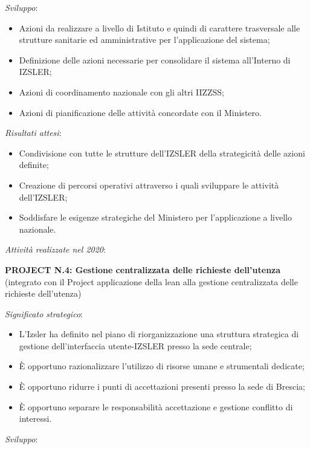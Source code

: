 \documentclass[
  12pt,
]{article}
\providecommand{\tightlist}{%
  \setlength{\itemsep}{0pt}\setlength{\parskip}{0pt}}
\begin{document}
\emph{Sviluppo}:

\begin{itemize}
\tightlist
\item
  Azioni da realizzare a livello di Istituto e quindi di carattere
  trasversale alle strutture sanitarie ed amministrative per
  l'applicazione del sistema;
\item
  Definizione delle azioni necessarie per consolidare il sistema
  all'Interno di IZSLER;
\item
  Azioni di coordinamento nazionale con gli altri IIZZSS;
\item
  Azioni di pianificazione delle attività concordate con il Ministero.
\end{itemize}

\emph{Risultati attesi}:

\begin{itemize}
\tightlist
\item
  Condivisione con tutte le strutture dell'IZSLER della strategicità
  delle azioni definite;
\item
  Creazione di percorsi operativi attraverso i quali sviluppare le
  attività dell'IZSLER;
\item
  Soddisfare le esigenze strategiche del Ministero per l'applicazione a
  livello nazionale.
\end{itemize}

\emph{Attività realizzate nel 2020}:

\textbf{PROJECT N.4: Gestione centralizzata delle richieste dell'utenza}
(integrato con il Project applicazione della lean alla gestione
centralizzata delle richieste dell'utenza)

\emph{Significato strategico}:

\begin{itemize}
\tightlist
\item
  L'Izsler ha definito nel piano di riorganizzazione una struttura
  strategica di gestione dell'interfaccia utente-IZSLER presso la sede
  centrale;
\item
  È opportuno razionalizzare l'utilizzo di risorse umane e strumentali
  dedicate;
\item
  È opportuno ridurre i punti di accettazioni presenti presso la sede di
  Brescia;
\item
  È opportuno separare le responsabilità accettazione e gestione
  conflitto di interessi.
\end{itemize}

\emph{Sviluppo}:
\end{document}

